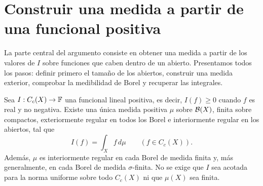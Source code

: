 \section{Construir una medida a partir de una funcional positiva}
La parte central del argumento consiste en obtener una medida a partir de los valores de $I$ sobre funciones que caben dentro de un abierto. Presentamos todos los pasos: definir primero el tamaño de los abiertos, construir una medida exterior, comprobar la medibilidad de Borel y recuperar las integrales.

\begin{teorema}\label{v2:riesz-positivo-general}
Sea $I:C_c(X)\to\mathbb F$ una funcional lineal positiva, es decir, $I(f)\ge0$ cuando $f$ es real y no negativa. Existe una única medida positiva $\mu$ sobre $\mathcal B(X)$, finita sobre compactos, exteriormente regular en todos los Borel e interiormente regular en los abiertos, tal que
\[
 I(f)=\int_X f\,d\mu\qquad(f\in C_c(X)).
\]
Además, $\mu$ es interiormente regular en cada Borel de medida finita y, más generalmente, en cada Borel de medida $\sigma$-finita. No se exige que $I$ sea acotada para la norma uniforme sobre todo $C_c(X)$ ni que $\mu(X)$ sea finita.
\end{teorema}
